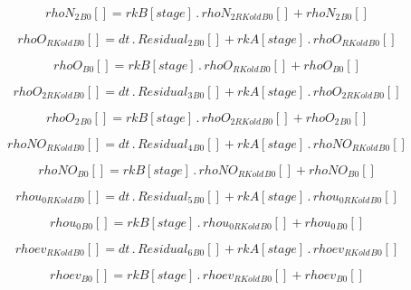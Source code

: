 \documentclass{article}
\begin{document}
\begin{dmath}{rhoN_{2}{_{B0}}}[{}] = {rkB}[{stage}] \,.\, {rhoN_{2 RKold}{_{B0}}}[{}] + {rhoN_{2}{_{B0}}}[{}]\end{dmath}

\begin{dmath}{rhoO_{RKold}{_{B0}}}[{}] = dt \,.\, {Residual_{2}{_{B0}}}[{}] + {rkA}[{stage}] \,.\, {rhoO_{RKold}{_{B0}}}[{}]\end{dmath}

\begin{dmath}{rhoO{_{B0}}}[{}] = {rkB}[{stage}] \,.\, {rhoO_{RKold}{_{B0}}}[{}] + {rhoO{_{B0}}}[{}]\end{dmath}

\begin{dmath}{rhoO_{2 RKold}{_{B0}}}[{}] = dt \,.\, {Residual_{3}{_{B0}}}[{}] + {rkA}[{stage}] \,.\, {rhoO_{2 RKold}{_{B0}}}[{}]\end{dmath}

\begin{dmath}{rhoO_{2}{_{B0}}}[{}] = {rkB}[{stage}] \,.\, {rhoO_{2 RKold}{_{B0}}}[{}] + {rhoO_{2}{_{B0}}}[{}]\end{dmath}

\begin{dmath}{rhoNO_{RKold}{_{B0}}}[{}] = dt \,.\, {Residual_{4}{_{B0}}}[{}] + {rkA}[{stage}] \,.\, {rhoNO_{RKold}{_{B0}}}[{}]\end{dmath}

\begin{dmath}{rhoNO{_{B0}}}[{}] = {rkB}[{stage}] \,.\, {rhoNO_{RKold}{_{B0}}}[{}] + {rhoNO{_{B0}}}[{}]\end{dmath}

\begin{dmath}{rhou_{0 RKold}{_{B0}}}[{}] = dt \,.\, {Residual_{5}{_{B0}}}[{}] + {rkA}[{stage}] \,.\, {rhou_{0 RKold}{_{B0}}}[{}]\end{dmath}

\begin{dmath}{rhou_{0}{_{B0}}}[{}] = {rkB}[{stage}] \,.\, {rhou_{0 RKold}{_{B0}}}[{}] + {rhou_{0}{_{B0}}}[{}]\end{dmath}

\begin{dmath}{rhoev_{RKold}{_{B0}}}[{}] = dt \,.\, {Residual_{6}{_{B0}}}[{}] + {rkA}[{stage}] \,.\, {rhoev_{RKold}{_{B0}}}[{}]\end{dmath}

\begin{dmath}{rhoev{_{B0}}}[{}] = {rkB}[{stage}] \,.\, {rhoev_{RKold}{_{B0}}}[{}] + {rhoev{_{B0}}}[{}]\end{dmath}
\end{document}
